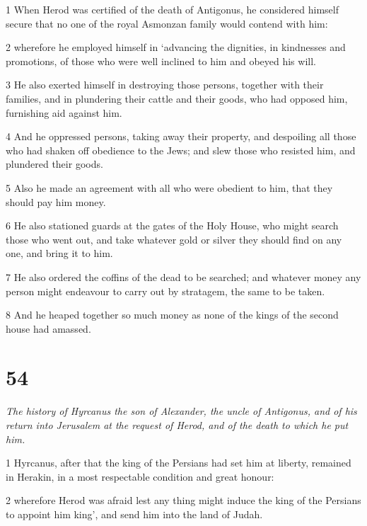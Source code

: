 \par 1 When Herod was certified of the death of Antigonus, he considered himself secure that no one of the royal Asmonzan family would contend with him: 

\par 2 wherefore he employed himself in ‘advancing the dignities, in kindnesses and promotions, of those who were well inclined to him and obeyed his will. 

\par 3 He also exerted himself in destroying those persons, together with their families, and in plundering their cattle and their goods, who had opposed him, furnishing aid against him. 

\par 4 And he oppressed persons, taking away their property, and despoiling all those who had shaken off obedience to the Jews; and slew those who resisted him, and plundered their goods. 

\par 5 Also he made an agreement with all who were obedient to him, that they should pay him money. 

\par 6 He also stationed guards at the gates of the Holy House, who might search those who went out, and take whatever gold or silver they should find on any one, and bring it to him. 

\par 7 He also ordered the coffins of the dead to be searched; and whatever money any person might endeavour to carry out by stratagem, the same to be taken. 

\par 8 And he heaped together so much money as none of the kings of the second house had amassed. 

\chapter{54}

\par \textit{The history of Hyrcanus the son of Alexander, the uncle of Antigonus, and of his return into Jerusalem at the request of Herod, and of the death to which he put him.}

\par 1 Hyrcanus, after that the king of the Persians had set him at liberty, remained in Herakin, in a most respectable condition and great honour: 

\par 2 wherefore Herod was afraid lest any thing might induce the king of the Persians to appoint him king’, and send him into the land of Judah. 

